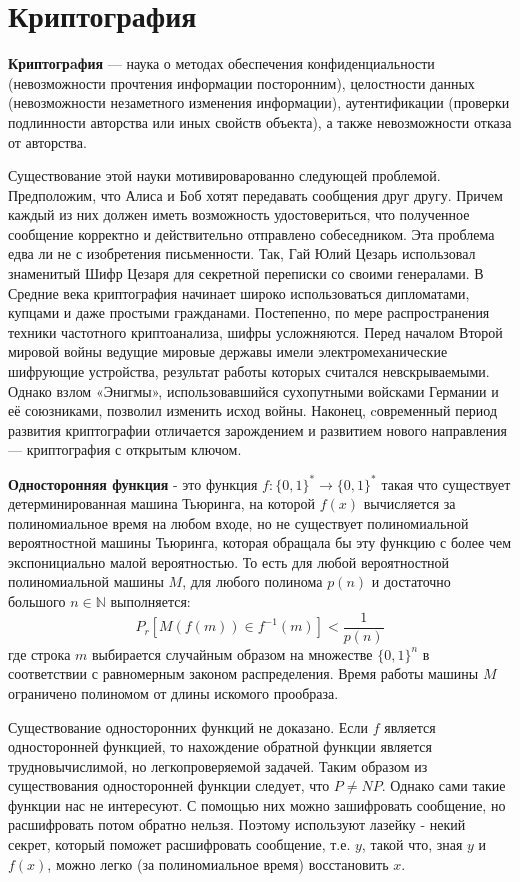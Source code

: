 \documentclass{article}
\newcommand{\blank} {
\newline
\newline
}
\theoremstyle{definition}
\begin{document}
\section{Криптография}
\textbf{Криптогрaфия} — наука о методах обеспечения конфиденциальности (невозможности прочтения информации посторонним), целостности данных (невозможности незаметного изменения информации), аутентификации (проверки подлинности авторства или иных свойств объекта), а также
невозможности отказа от авторства.
\blank
Существование этой науки мотивироварованно следующей проблемой. Предположим, что Алиса
и Боб хотят передавать сообщения друг другу. Причем каждый из них должен иметь возможность
удостовериться, что полученное сообщение корректно и действительно отправлено собеседником. Эта
проблема едва ли не с изобретения письменности. Так, Гай Юлий Цезарь использовал знаменитый
Шифр Цезаря для секретной переписки со своими генералами. В Средние века криптография начинает широко использоваться дипломатами, купцами и даже простыми гражданами. Постепенно, по мере
распространения техники частотного криптоанализа, шифры усложняются. Перед началом Второй
мировой войны ведущие мировые державы имели электромеханические шифрующие устройства,
результат работы которых считался невскрываемыми. Однако взлом «Энигмы», использовавшийся
сухопутными войсками Германии и её союзниками, позволил изменить исход войны. Наконец, cовременный период развития криптографии отличается зарождением и развитием нового направления —
криптография с открытым ключом.
\blank
\textbf{Односторонняя функция} - это функция $f : \{0, 1\}^* \rightarrow \{0, 1\}^*$ такая что существует детерминированная машина Тьюринга, на которой $f(x)$ вычисляется за полиномиальное время на любом входе, но не существует полиномиальной вероятностной машины Тьюринга, которая обращала бы эту функцию с более чем экспонициально малой вероятностью. То есть для любой вероятностной полиномиальной машины $M$, для любого полинома $p(n)$ и достаточно большого $n \in \mathbb{N}$ выполняется:
$$P_r[M(f(m)) \in f^{-1}(m)] < \frac{1}{p(n)}$$
где строка $m$ выбирается случайным образом на множестве $\{0, 1\}^n$ в соответствии с равномерным законом распределения. Время работы машины $M$ ограничено полиномом от длины искомого прообраза.
\blank
Существование односторонних функций не доказано. Если $f$ является односторонней функцией, то нахождение обратной функции является трудновычислимой, но легкопроверяемой задачей. Таким образом из существования односторонней функции следует, что $P \neq NP$. Однако сами такие функции нас не интересуют. С помощью них можно зашифровать сообщение, но расшифровать потом обратно нельзя. Поэтому используют лазейку - некий секрет, который поможет расшифровать сообщение, т.е. $y$, такой что, зная $y$ и $f(x)$, можно легко (за полиномиальное время) восстановить $x$.
\end{document}
